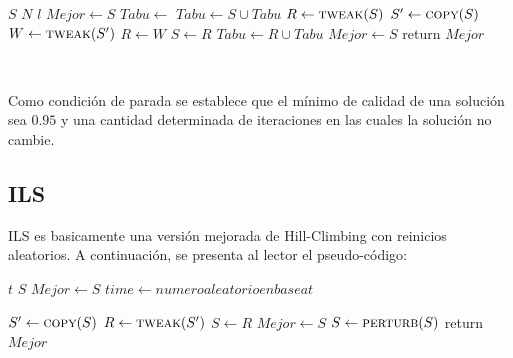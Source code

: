 \documentclass[11pt]{article}
\begin{document}
    {\fontsize{9}{12}\selectfont
    \begin{algorithmic}
            \State $S$ 
            \State $N$ 
            \State $l$ 
            \State $Mejor \gets S$ 
            \State $Tabu \gets {}$  
            \State $Tabu \gets S \cup Tabu$ 
                    \State {}
                \EndIf
                \State $R \gets \Call{tweak}{S}$
                \State $S' \gets \Call{copy}{S}$
                \State $W \gets \Call{tweak}{S'}$
                    \State $R \gets W$
                \EndIf
            \EndFor
                \State $S \gets R$
                \State $Tabu \gets R \cup Tabu$ 
            \EndIf
                \State $Mejor \gets S$
            \EndIf
            \EndWhile
            \State return $Mejor$
        \EndFunction
    \end{algorithmic}
    }

    ~\ 

    Como condición de parada se establece que el mínimo de calidad de una solución sea $0.95$ y una cantidad determinada de iteraciones en las cuales la solución no cambie.

    \subsection{ILS}
    ILS es basicamente una versión mejorada de Hill-Climbing con reinicios aleatorios. A continuación, se presenta al lector el pseudo-código:


    {\fontsize{9}{12}\selectfont
    \begin{algorithmic}
            \State $t$ 
            \State $S$ 
            \State $Mejor \gets S$
                \State $time \gets numero aleatorio en base a t$

                    \State $S' \gets \Call{copy}{S}$
                    \State $R \gets \Call{tweak}{S'}$
                        \State $S \gets R$
                    \EndIf
                \EndWhile
                \State $Mejor \gets S$
            \EndIf
            \State $S \gets \Call{perturb}{S}$
            \EndWhile
            \State return $Mejor$
        \EndFunction
    \end{algorithmic}
    }
\end{document}
